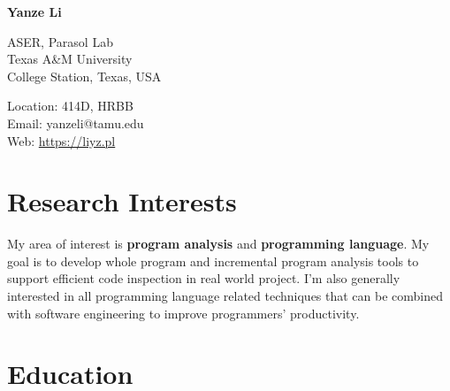 \documentclass[12pt,letterpaper]{report}
\newcommand{\myname}{Yanze Li}
\newcommand{\namefont}[1]{{\normalfont\bfseries\Huge{#1}}}
\newcommand{\listitemspace}{0.15em}
\renewenvironment{itemize}
{\begin{list}{}{\setlength{\leftmargin}{0em}
			\setlength{\parskip}{0em}
			\setlength{\itemsep}{\listitemspace}
			\setlength{\parsep}{\listitemspace}}}
	{\end{list}}
\begin{document}
	\raggedright
	
	\namefont{\myname}
	
	\vspace{1em}
	\begin{minipage}[t]{0.495\textwidth}
		ASER, Parasol Lab \\
		Texas A\&M University \\
		College Station, Texas, USA
	\end{minipage}
	\begin{minipage}[t]{0.495\textwidth}
		Location: 414D, HRBB \\
		Email: yanzeli@tamu.edu \\
		Web: \href{https://liyz.pl}{https://liyz.pl} \\
	\end{minipage}
	\vspace{0.5em}
	

	
	\section*{Research Interests}
	
	\begin{itemize}
		\item My area of interest is \textbf{program analysis} and \textbf{programming language}. My goal is to develop whole program and incremental program analysis tools to support efficient code inspection in real world project. I’m also generally interested in all programming language related techniques that can be combined with software engineering to improve programmers’ productivity.
	\end{itemize}


	
	\section*{Education}
	
\end{document}
